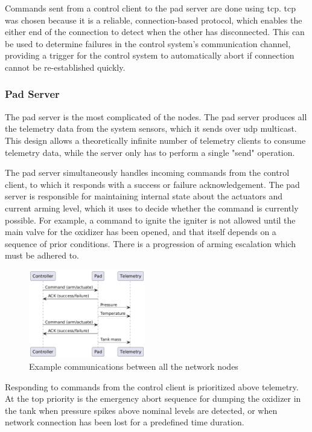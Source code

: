 Commands sent from a control client to the pad server are done using \gls{tcp}. \cite{hybrid-comms} \Gls{tcp} was
chosen because it is a reliable, connection-based protocol, which enables the either end of the connection to detect
when the other has disconnected. This can be used to determine failures in the control system's communication channel,
providing a trigger for the control system to automatically abort if connection cannot be re-established quickly.

\subsubsection{Pad Server}

The pad server is the most complicated of the nodes. The pad server produces all the telemetry data from the system
sensors, which it sends over \gls{udp} multicast. \cite{hybrid-comms} This design allows a theoretically infinite
number of telemetry clients to consume telemetry data, while the server only has to perform a single "send" operation.

The pad server simultaneously handles incoming commands from the control client, to which it responds with a success or
failure acknowledgement. The pad server is responsible for maintaining internal state about the actuators and current
arming level, which it uses to decide whether the command is currently possible. For example, a command to ignite the
igniter is not allowed until the main valve for the oxidizer has been opened, and that itself depends on a sequence of
prior conditions. There is a progression of arming escalation which must be adhered to.

\begin{figure}[H]
    \center
    \includegraphics[width=2in]{assets/diagrams/all_nodes_seq.png}
    \caption{Example communications between all the network nodes}
\end{figure}

Responding to commands from the control client is prioritized above telemetry. At the top priority is the emergency
abort sequence for dumping the oxidizer in the tank when pressure spikes above nominal levels are detected, or when
network connection has been lost for a predefined time duration.

